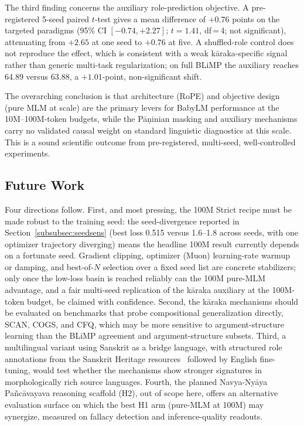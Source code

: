 The third finding concerns the auxiliary role-prediction objective. A pre-registered 5-seed paired $t$-test gives a mean difference of $+0.76$ points on the targeted paradigms (95\% CI $[-0.74, +2.27]$; $t = 1.41$, df\,=\,4; not significant), attenuating from $+2.65$ at one seed to $+0.76$ at five. A shuffled-role control does not reproduce the effect, which is consistent with a weak kāraka-specific signal rather than generic multi-task regularization; on full BLiMP the auxiliary reaches 64.89 versus 63.88, a $+1.01$-point, non-significant shift.

The overarching conclusion is that architecture (RoPE) and objective design (pure MLM at scale) are the primary levers for BabyLM performance at the 10M--100M-token budgets, while the Pāṇinian masking and auxiliary mechanisms carry no validated causal weight on standard linguistic diagnostics at this scale. This is a sound scientific outcome from pre-registered, multi-seed, well-controlled experiments.

\subsection{Future Work}

Four directions follow. First, and most pressing, the 100M Strict recipe must be made robust to the training seed: the seed-divergence reported in Section~\ref{subsubsec:seedsens} (best loss 0.515 versus 1.6--1.8 across seeds, with one optimizer trajectory diverging) means the headline 100M result currently depends on a fortunate seed. Gradient clipping, optimizer (Muon) learning-rate warmup or damping, and best-of-$N$ selection over a fixed seed list are concrete stabilizers; only once the low-loss basin is reached reliably can the 100M pure-MLM advantage, and a fair multi-seed replication of the kāraka auxiliary at the 100M-token budget, be claimed with confidence. Second, the kāraka mechanisms should be evaluated on benchmarks that probe compositional generalization directly, SCAN, COGS, and CFQ, which may be more sensitive to argument-structure learning than the BLiMP agreement and argument-structure subsets. Third, a multilingual variant using Sanskrit as a bridge language, with structured role annotations from the Sanskrit Heritage resources~\cite{Huet2003SanskritHeritage} followed by English fine-tuning, would test whether the mechanisms show stronger signatures in morphologically rich source languages. Fourth, the planned Navya-Nyāya Pañcāvayava reasoning scaffold (H2), out of scope here, offers an alternative evaluation surface on which the best H1 arm (pure-MLM at 100M) may synergize, measured on fallacy detection and inference-quality readouts.

